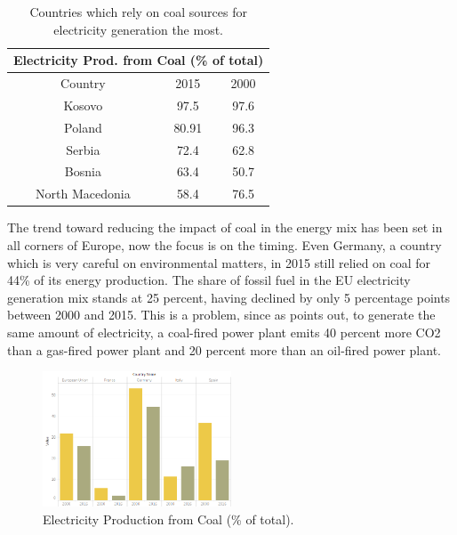 \documentclass{book}
\begin{document}
\bigskip
\begin{table}[H]
\begin{center}
\begin{tabular}{|c|c|c|}
\hline
\multicolumn{3}{|c|}{Electricity Prod. from Coal (\% of total)}\\
\hline
Country & 2015 & 2000 \\
\hline
Kosovo & 97.5 & 97.6\\
Poland & 80.91 & 96.3 \\
Serbia & 72.4 & 62.8 \\
Bosnia & 63.4 & 50.7\\
North Macedonia & 58.4 & 76.5\\
\hline
\end{tabular}
\caption{Countries which rely on coal sources for electricity generation the most.}
\end{center}
\end{table}

The trend toward reducing the impact of coal in the energy mix has been set in all corners of Europe, now the focus is on the timing. Even Germany, a country which is very careful on environmental matters, in 2015 still relied on coal for 44\% of its energy production. The share of fossil fuel in the EU electricity generation mix stands at 25 percent, having declined by only 5 percentage points between 2000 and 2015. This is a problem, since as \cite{tagliapietra2017beyond} points out, to generate the same amount of electricity, a coal-fired power plant emits 40 percent more CO2 than a gas-fired power plant and 20 percent more than an oil-fired power plant.

\bigskip
\begin{figure}[H]
\begin{center}
\captionsetup{justification=centering}
\includegraphics[width=0.5\textwidth]{Images/coal.png}
\caption{Electricity Production from Coal (\% of total). }
\end{center}
\end{figure}
\bigskip
\end{document}
